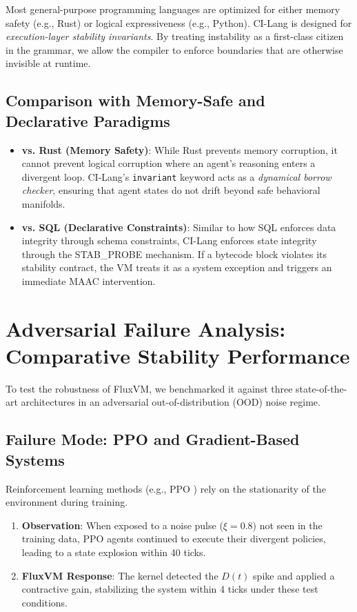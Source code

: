 \documentclass{article}
\begin{document}
Most general-purpose programming languages are optimized for either memory safety (e.g., Rust) or logical expressiveness (e.g., Python). CI-Lang is designed for \textit{execution-layer stability invariants}. By treating instability as a first-class citizen in the grammar, we allow the compiler to enforce boundaries that are otherwise invisible at runtime.

\subsection{Comparison with Memory-Safe and Declarative Paradigms}
\begin{itemize}
    \item \textbf{vs. Rust (Memory Safety)}: While Rust prevents memory corruption, it cannot prevent logical corruption where an agent's reasoning enters a divergent loop. CI-Lang's \texttt{invariant} keyword acts as a \textit{dynamical borrow checker}, ensuring that agent states do not drift beyond safe behavioral manifolds.
    \item \textbf{vs. SQL (Declarative Constraints)}: Similar to how SQL enforces data integrity through schema constraints, CI-Lang enforces state integrity through the STAB\_PROBE mechanism. If a bytecode block violates its stability contract, the VM treats it as a system exception and triggers an immediate MAAC intervention.
\end{itemize}

\section{Adversarial Failure Analysis: Comparative Stability Performance}
\label{sec:adversarial_analysis}

To test the robustness of FluxVM, we benchmarked it against three state-of-the-art architectures in an adversarial out-of-distribution (OOD) noise regime.

\subsection{Failure Mode: PPO and Gradient-Based Systems}
Reinforcement learning methods (e.g., PPO \cite{schulman2017proximal}) rely on the stationarity of the environment during training.
\begin{enumerate}
    \item \textbf{Observation}: When exposed to a noise pulse ($\xi = 0.8$) not seen in the training data, PPO agents continued to execute their divergent policies, leading to a state explosion within 40 ticks.
    \item \textbf{FluxVM Response}: The kernel detected the $D(t)$ spike and applied a contractive gain, stabilizing the system within 4 ticks under these test conditions.
\end{enumerate}
\end{document}
